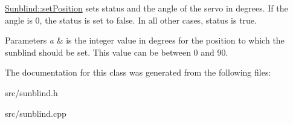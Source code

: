 \hyperlink{class_sunblind_aca584d938d6c28ec02d80fb287504434}{Sunblind\+::set\+Position} sets status and the angle of the servo in degrees. If the angle is 0, the status is set to false. In all other cases, status is true. 


\begin{DoxyParams}{Parameters}
{\em a} & is the integer value in degrees for the position to which the sunblind should be set. This value can be between 0 and 90. \\
\hline
\end{DoxyParams}


The documentation for this class was generated from the following files\+:\begin{DoxyCompactItemize}
\item 
src/sunblind.\+h\item 
src/sunblind.\+cpp\end{DoxyCompactItemize}
